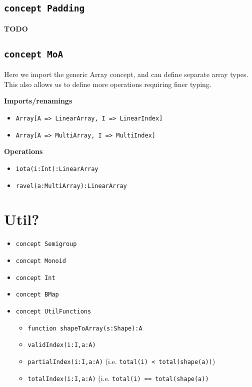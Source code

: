 \documentclass{article}
\begin{document}
\subsection{\texttt{concept Padding}}
\noindent \textbf{TODO}
\subsection{\texttt{concept MoA}}
\noindent Here we import the generic Array concept, and can define separate array types. This also allows us to define more operations requiring finer typing.

\noindent \textbf{Imports/renamings}
\begin{itemize}
    \item \texttt{Array[A => LinearArray, I => LinearIndex]}
    \item \texttt{Array[A => MultiArray, I => MultiIndex]}
\end{itemize}

\noindent \textbf{Operations}
\begin{itemize}
    \item \texttt{iota(i:Int):LinearArray}
    \item \texttt{ravel(a:MultiArray):LinearArray}
\end{itemize}

\section{Util?}
\begin{itemize}
    \item \texttt{concept Semigroup}
    \item \texttt{concept Monoid}
    \item \texttt{concept Int}
    \item \texttt{concept BMap}
    \item \texttt{concept UtilFunctions}
    \begin{itemize}
        \item \texttt{function shapeToArray(s:Shape):A}
        \item \texttt{validIndex(i:I,a:A)}
        \item \texttt{partialIndex(i:I,a:A)} (i.e. \texttt{total(i) < total(shape(a))})
        \item \texttt{totalIndex(i:I,a:A)} (i.e. \texttt{total(i) == total(shape(a))}
    \end{itemize}
\end{itemize}
\end{document}
